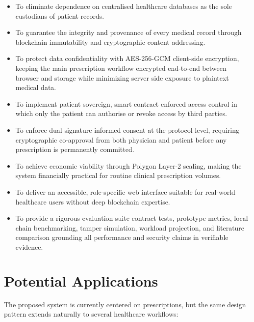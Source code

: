 \documentclass[12pt,a4wide]{report}
\begin{document}
\begin{itemize}
  \item To eliminate dependence on centralised healthcare databases as the sole
    custodians of patient records.
  \item To guarantee the integrity and provenance of every medical record through
    blockchain immutability and cryptographic content addressing.
  \item To protect data confidentiality with AES-256-GCM client-side encryption,
    keeping the main prescription workflow encrypted end-to-end between browser
    and storage while minimizing server side exposure to plaintext medical data.
  \item To implement patient sovereign, smart contract enforced access control
    in which only the patient can authorise or revoke access by third parties.
  \item To enforce dual-signature informed consent at the protocol level, requiring
    cryptographic co-approval from both physician and patient before any prescription
    is permanently committed.
  \item To achieve economic viability through Polygon Layer-2 scaling, making the
    system financially practical for routine clinical prescription volumes.
  \item To deliver an accessible, role-specific web interface suitable for
    real-world healthcare users without deep blockchain expertise.
  \item To provide a rigorous evaluation suite contract tests, prototype
    metrics, local-chain benchmarking, tamper simulation, workload projection,
    and literature comparison grounding all performance and security claims
    in verifiable evidence.
\end{itemize}

\section{Potential Applications}

The proposed system is currently centered on prescriptions, but the same design
pattern extends naturally to several healthcare workflows:
\end{document}

